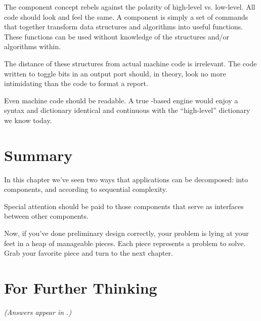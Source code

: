 The component concept rebels against the polarity of high-level vs.
low-level. All code should look and feel the same. A component is simply
a set of commands that together transform data structures and
algorithms into useful functions. These functions can be used without
knowledge of the structures and/or algorithms within.

The distance of these structures from actual machine code is
irrelevant. The code written to toggle bits in an output port should,
in theory, look no more intimidating than the code to format a report.

Even machine code should be readable. A true \Forth{}-based
engine would enjoy a syntax and dictionary identical and continuous
with the ``high-level'' dictionary we know today.%

\section{Summary}

In this chapter we've seen two ways that applications can be
decomposed: into components, and according to sequential complexity.

Special attention should be paid to those components that serve as
interfaces between other components.

Now, if you've done preliminary design correctly, your problem is
lying at your feet in a heap of manageable pieces. Each piece represents a
problem to solve. Grab your favorite piece and turn to the next chapter.%

\section{For Further Thinking}

\emph{(Answers appear in .)}

